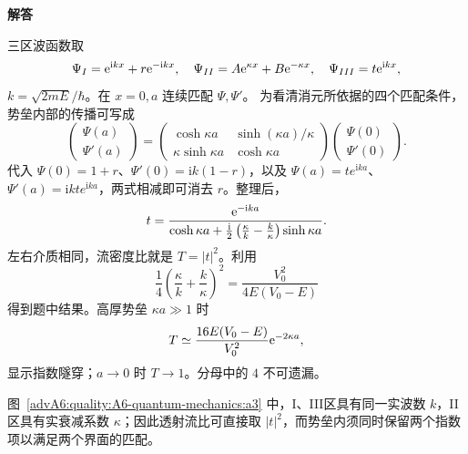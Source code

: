 \begin{advsolution}
\begin{center}\begin{minipage}{.96\linewidth}\centering
\raggedright{\bfseries\color{DeepBlue}解答}\par\smallskip\centering

\label{advA6:quality:A6-quantum-mechanics:a3}
\end{minipage}\end{center}

三区波函数取
\[
 \Psi_I=\mathrm e^{\mathrm i kx}+r\mathrm e^{-\mathrm i kx},\quad
 \Psi_{II}=A\mathrm e^{\kappa x}+B\mathrm e^{-\kappa x},\quad
 \Psi_{III}=t\mathrm e^{\mathrm i kx},
\]
$k=\sqrt{2mE}/\hbar$。在 $x=0,a$ 连续匹配 $\Psi,\Psi'$。
为看清消元所依据的四个匹配条件，势垒内部的传播可写成
\[
 \begin{pmatrix}\Psi(a)\\\Psi'(a)\end{pmatrix}
 =\begin{pmatrix}
 \cosh\kappa a&\sinh(\kappa a)/\kappa\\
 \kappa\sinh\kappa a&\cosh\kappa a
 \end{pmatrix}
 \begin{pmatrix}\Psi(0)\\\Psi'(0)\end{pmatrix}.
\]
代入 $\Psi(0)=1+r$、$\Psi'(0)=\mathrm ik(1-r)$，以及 $\Psi(a)=te^{\mathrm ika}$、$\Psi'(a)=\mathrm ikte^{\mathrm ika}$，两式相减即可消去 $r$。整理后，
\[
 t=\frac{\mathrm e^{-\mathrm i ka}}
 {\cosh\kappa a+
 \frac{\mathrm i}{2}\left(\frac\kappa k-\frac k\kappa\right)
 \sinh\kappa a}.
\]
左右介质相同，流密度比就是 $T=|t|^2$。利用
\[
 \frac14\left(\frac\kappa k+\frac k\kappa\right)^2
 =\frac{V_0^2}{4E(V_0-E)}
\]
得到题中结果。高厚势垒 $\kappa a\gg1$ 时
\[
 T\simeq
 \frac{16E(V_0-E)}{V_0^2}\mathrm e^{-2\kappa a},
\]
显示指数隧穿；$a\to0$ 时 $T\to1$。分母中的 $4$ 不可遗漏。

图~\ref{advA6:quality:A6-quantum-mechanics:a3} 中，I、III区具有同一实波数 $k$，II区具有实衰减系数 $\kappa$；因此透射流比可直接取 $|t|^2$，而势垒内须同时保留两个指数项以满足两个界面的匹配。
\end{advsolution}

